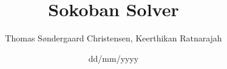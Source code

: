 \documentclass[a4paper,10pt]{article}
\title{Sokoban Solver}
\author{Thomas Søndergaard Christensen, Keerthikan Ratnarajah}
\date{dd/mm/yyyy}
\begin{document}


\newpage
\tableofcontents
\newpage
\listoffigures
\listoftables
\listoftodos
\clearpage
\newpage


%

\newpage

\end{document}
